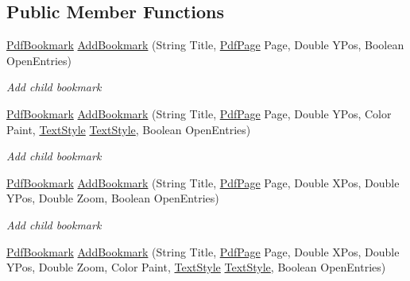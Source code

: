 \subsection*{Public Member Functions}
\begin{DoxyCompactItemize}
\item 
\hyperlink{class_pdf_file_writer_1_1_pdf_bookmark}{Pdf\+Bookmark} \hyperlink{class_pdf_file_writer_1_1_pdf_bookmark_ac23a59152a4fc089ae3d6c80c3f2602c}{Add\+Bookmark} (String Title, \hyperlink{class_pdf_file_writer_1_1_pdf_page}{Pdf\+Page} Page, Double Y\+Pos, Boolean Open\+Entries)
\begin{DoxyCompactList}\small\item\em Add child bookmark \end{DoxyCompactList}\item 
\hyperlink{class_pdf_file_writer_1_1_pdf_bookmark}{Pdf\+Bookmark} \hyperlink{class_pdf_file_writer_1_1_pdf_bookmark_a894583859afd9e001e967a27d6ec22fd}{Add\+Bookmark} (String Title, \hyperlink{class_pdf_file_writer_1_1_pdf_page}{Pdf\+Page} Page, Double Y\+Pos, Color Paint, \hyperlink{class_pdf_file_writer_1_1_pdf_bookmark_aeeed840fb92fc3e01ed8152a6a8c537c}{Text\+Style} \hyperlink{class_pdf_file_writer_1_1_pdf_bookmark_aeeed840fb92fc3e01ed8152a6a8c537c}{Text\+Style}, Boolean Open\+Entries)
\begin{DoxyCompactList}\small\item\em Add child bookmark \end{DoxyCompactList}\item 
\hyperlink{class_pdf_file_writer_1_1_pdf_bookmark}{Pdf\+Bookmark} \hyperlink{class_pdf_file_writer_1_1_pdf_bookmark_a3348ac3ec417cfea2fe3dc6c8f6d08a6}{Add\+Bookmark} (String Title, \hyperlink{class_pdf_file_writer_1_1_pdf_page}{Pdf\+Page} Page, Double X\+Pos, Double Y\+Pos, Double Zoom, Boolean Open\+Entries)
\begin{DoxyCompactList}\small\item\em Add child bookmark \end{DoxyCompactList}\item 
\hyperlink{class_pdf_file_writer_1_1_pdf_bookmark}{Pdf\+Bookmark} \hyperlink{class_pdf_file_writer_1_1_pdf_bookmark_a694b407b860deea96732906631c5ecfa}{Add\+Bookmark} (String Title, \hyperlink{class_pdf_file_writer_1_1_pdf_page}{Pdf\+Page} Page, Double X\+Pos, Double Y\+Pos, Double Zoom, Color Paint, \hyperlink{class_pdf_file_writer_1_1_pdf_bookmark_aeeed840fb92fc3e01ed8152a6a8c537c}{Text\+Style} \hyperlink{class_pdf_file_writer_1_1_pdf_bookmark_aeeed840fb92fc3e01ed8152a6a8c537c}{Text\+Style}, Boolean Open\+Entries)

\end{DoxyCompactItemize}
